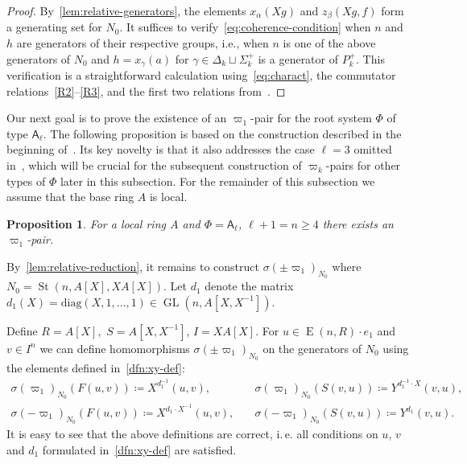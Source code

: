 \documentclass[oneside, 10pt]{amsart}
\DeclareMathOperator{\St}{St}
\DeclareMathOperator{\GL}{GL}
\DeclareMathOperator{\E}{E}
\newcommand{\rA}{\mathsf{A}}
\newcommand{\inv}{^{-1}}
\numberwithin{equation}{section}
\numberwithin{thm}{section}
\numberwithin{lemma}{section}
\newtheorem{prop}[lemma]{Proposition}
\theoremstyle{definition}
\theoremstyle{remark}
\begin{document}
\begin{proof}
By~\cref{lem:relative-generators}, the elements $x_\alpha(Xg)$ and $z_\beta(Xg, f)$ form a generating set for \( N_0 \).
It suffices to verify~\eqref{eq:coherence-condition} when \( n \) and \( h \) are generators of their respective groups,
i.e., when \( n \) is one of the above generators of \( N_0 \) and \( h = x_\gamma(a) \) for \( \gamma \in \Delta_k \sqcup \Sigma^+_k \) is a generator of \( P_k^+ \).
This verification is a straightforward calculation using~\eqref{eq:charact}, the commutator relations~\eqref{R2}--\eqref{R3}, and the first two relations from~\cite[Lemma~9]{S15}.
\end{proof}

Our next goal is to prove the existence of an $\varpi_1$-pair for the root system $\Phi$ of type $\rA_\ell$.
The following proposition is based on the construction described in the beginning of~\cite[\S~3]{Tu83}.
Its key novelty is that it also addresses the case \( \ell = 3 \) omitted in~\cite{Tu83}, which will be crucial for the subsequent construction of \( \varpi_k \)-pairs for other types of \( \Phi \) later in this subsection.
For the remainder of this subsection we assume that the base ring $A$ is local.

\begin{prop} \label{prop:sigma-construction}
For a local ring $A$ and $\Phi = \rA_\ell$, $\ell + 1 = n \geq 4$ there exists an $\varpi_1$-pair.
\end{prop}

By~\eqref{lem:relative-reduction}, it remains to construct $\sigma(\pm\varpi_1)_{N_0}$ where $N_0 = \St(n, A[X], XA[X])$.
Let \( d_1 \) denote the matrix $d_1(X) = \mathrm{diag}(X, 1, \ldots, 1) \in \GL(n, A[X, X\inv])$.

Define $R = A[X],$ $S = A[X, X\inv]$, $I = XA[X].$
For $u \in \E(n, R) \cdot e_1$ and $v \in I^n$ we can define homomorphisms $\sigma(\pm\varpi_1)_{N_0}$ on the generators of $N_{0}$ using the elements defined in~\cref{dfn:xy-def}:
\begin{align}
\sigma(\varpi_1)_{N_0} \left(F(u, v)\right) \coloneqq X^{d_1^{-1}}(u, v), & \quad \sigma(\varpi_1)_{N_0} \left(S(v, u)\right) \coloneqq Y^{d_1^{-1} \cdot X}(v, u), \label{eq:def-sigma-1} \\
\sigma(-\varpi_1)_{N_0} \left(F(u, v)\right) \coloneqq X^{d_1 \cdot X^{-1}}(u, v),& \quad \sigma(-\varpi_1)_{N_0} \left(S(v, u)\right) \coloneqq Y^{d_1}(v, u). \label{eq:def-sigma-2}
\end{align}
It is easy to see that the above definitions are correct, i.\,e. all conditions on $u$, $v$ and $d_1$ formulated in~\cref{dfn:xy-def} are satisfied.
\end{document}
